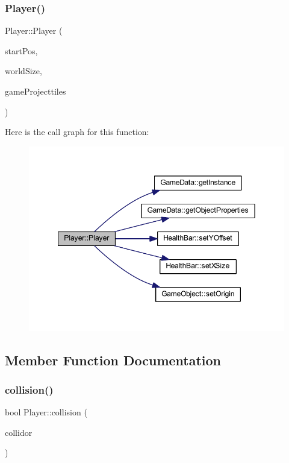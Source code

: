 \subsubsection{\texorpdfstring{Player()}{Player()}}
{\footnotesize\ttfamily Player\+::\+Player (\begin{DoxyParamCaption}\item[{const sf\+::\+Vector2f \&}]{start\+Pos,  }\item[{const sf\+::\+Vector2f \&}]{world\+Size,  }\item[{\hyperlink{class_player_a2678e391270a5e0fd6c77127657cb4d7}{Game\+Object\+Ptr\+Vector} \&}]{game\+Projecttiles }\end{DoxyParamCaption})}

Here is the call graph for this function\+:
\nopagebreak
\begin{figure}[H]
\begin{center}
\leavevmode
\includegraphics[width=349pt]{class_player_a64fb9eae1f16453837b951b04078d8af_cgraph}
\end{center}
\end{figure}


\subsection{Member Function Documentation}
\mbox{\label{class_player_a669d12e0034e51489a37268b2ca7aab0}} 
\subsubsection{\texorpdfstring{collision()}{collision()}}
{\footnotesize\ttfamily bool Player\+::collision (\begin{DoxyParamCaption}\item[{const std\+::shared\+\_\+ptr$<$ \hyperlink{class_game_object}{Game\+Object} $>$ \&}]{collidor }\end{DoxyParamCaption})\hspace{0.3cm}{\ttfamily [virtual]}}




